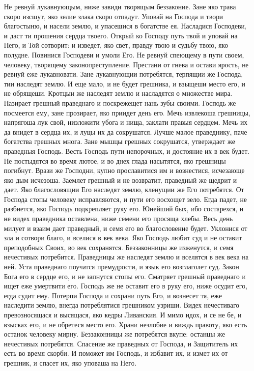 \mychapterending

\begin{mymulticols}
 




Не ревнуй лукавнующым, ниже завиди творящым беззаконие. Зане яко трава скоро изсшут, яко зелие злака скоро отпадут. Уповай на Господа и твори благостыню, и насели землю, и упасешися в богатстве ея. Насладися Господеви, и даст ти прошения сердца твоего. Открый ко Господу путь твой и уповай на Него, и Той сотворит: и изведет, яко свет, правду твою и судьбу твою, яко полудне. Повинися Господеви и умоли Его. Не ревнуй спеющему в пути своем, человеку, творящему законопреступление. Престани от гнева и остави ярость, не ревнуй еже лукавновати. Зане лукавнующии потребятся, терпящии же Господа, тии наследят землю. И еще мало, и не будет грешника, и взыщеши место его, и не обрящеши. Кротцыи же наследят землю и насладятся о множестве мира. Назирает грешный праведнаго и поскрежещет нань зубы своими. Господь же посмеется ему, зане прозирает, яко приидет день его. Мечь извлекоша грешницы, напрягоша лук свой, низложити убога и нища, заклати правыя сердцем. Мечь их да внидет в сердца их, и луцы их да сокрушатся. Лучше малое праведнику, паче богатства грешных многа. Зане мышцы грешных сокрушатся, утверждает же праведныя Господь. Весть Господь пути непорочных, и достояние их в век будет. Не постыдятся во время лютое, и во днех глада насытятся, яко грешницы погибнут. Врази же Господни, купно прославитися им и вознестися, исчезающе яко дым исчезоша. Заемлет грешный и не возвратит, праведный же щедрит и дает. Яко благословящии Его наследят землю, кленущии же Его потребятся. От Господа стопы человеку исправляются, и пути его восхощет зело. Егда падет, не разбиется, яко Господь подкрепляет руку его. Юнейший бых, ибо состарехся, и не видех праведника оставлена, ниже семени его просяща хлебы. Весь день милует и взаим дает праведный, и семя его во благословение будет. Уклонися от зла и сотвори благо, и вселися в век века. Яко Господь любит суд и не оставит преподобных Своих, во век сохранятся. Беззаконницы же изженутся, и семя нечестивых потребится. Праведницы же наследят землю и вселятся в век века на ней. Уста праведнаго поучатся премудрости, и язык его возглаголет суд. Закон Бога его в сердце его, и не запнутся стопы его. Сматряет грешный праведнаго и ищет еже умертвити его. Господь же не оставит его в руку его, ниже осудит его, егда судит ему. Потерпи Господа и сохрани путь Его, и вознесет тя, еже наследити землю, внегда потреблятися грешником узриши. Видех нечестиваго превозносящася и высящася, яко кедры Ливанския. И мимо идох, и се не бе, и взысках его, и не обретеся место его. Храни незлобие и виждь правоту, яко есть останок человеку мирну. Беззаконницы же потребятся вкупе: останцы же нечестивых потребятся. Спасение же праведных от Господа, и Защититель их есть во время скорби. И поможет им Господь, и избавит их, и измет их от грешник, и спасет их, яко уповаша на Него.



\end{mymulticols}
